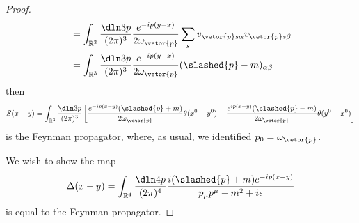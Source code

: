 \begin{proof}
\begin{align*}
      &= \int_{\mathbb{R}^3} \frac{\dln3p}{(2\pi)^3} \frac{e^{-ip(y - x)}}{2\omega_{\vetor{p}}} \sum_s v_{\vetor{p}s \alpha} \bar{v}_{\vetor{p} s \beta}\\
      &= \int_{\mathbb{R}^3} \frac{\dln3p}{(2\pi)^3} \frac{e^{-ip(y - x)}}{2\omega_{\vetor{p}}} (\slashed{p} - m)_{\alpha \beta}
   \end{align*}
   then
   \begin{equation*}
      S(x - y) = \int_{\mathbb{R}^3} \frac{\dln3p}{(2\pi)^3} \left[\frac{e^{-ip(x- y)}(\slashed{p} + m)}{2\omega_{\vetor{p}}} \theta(x^0 - y^0) - \frac{e^{ip(x - y)}(\slashed{p} - m)}{2\omega_{\vetor{p}}}\theta(y^0 - x^0)\right]
   \end{equation*}
   is the Feynman propagator, where, as usual, we identified \(p_0 = \omega_{\vetor{p}}\).

   We wish to show the map
   \begin{equation*}
       \Delta(x - y) = \int_{\mathbb{R}^4} \frac{\dln4p}{(2\pi)^4} \frac{i(\slashed{p} + m) e^{-ip(x - y)}}{p_\mu p^\mu - m^2 + i \epsilon}
   \end{equation*}
   is equal to the Feynman propagator. 


\end{proof}
